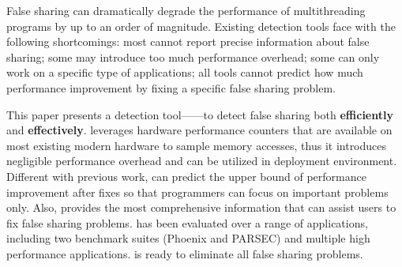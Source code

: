 False sharing can dramatically degrade the performance of multithreading programs by up to an order of magnitude. 
Existing detection tools face with the following shortcomings: most cannot report precise information about false sharing; some may introduce too much performance overhead; some can only work on a specific type of applications; all tools cannot predict how much performance improvement by fixing a specific false sharing problem. 

This paper presents a detection tool---\cheetah{}---to detect false sharing both {\bf efficiently} and {\bf effectively}. \cheetah{} leverages hardware performance counters that are available on most existing modern hardware to sample memory accesses, thus it introduces negligible performance overhead and can be utilized in deployment environment. Different with previous work, \cheetah{} can predict the upper bound of performance improvement after fixes so that programmers can focus on important problems only. Also, \cheetah{} provides the most comprehensive information that can assist users to fix false sharing problems. \cheetah{} has been evaluated over a range of applications, including two benchmark suites (Phoenix and PARSEC) and multiple high performance applications. \Cheetah{} is ready to eliminate all false sharing problems.  